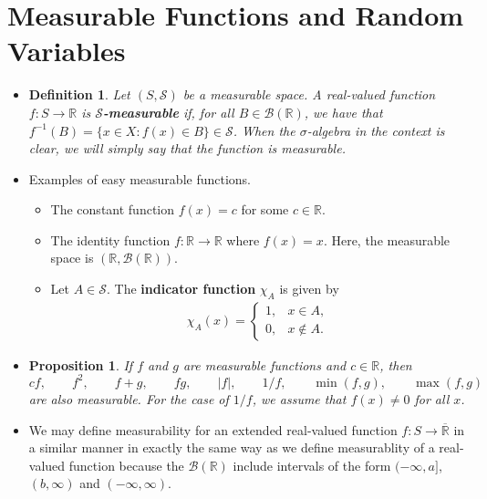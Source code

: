 \documentclass[10pt]{article}
\newtheorem{definition}[lemma]{Definition}
\newtheorem{proposition}[lemma]{Proposition}
\newcommand{\mcal}[1]{\mathcal{#1}}
\newcommand{\Real}{\mathbb{R}}
\begin{document}
\section{Measurable Functions and Random Variables}

\begin{itemize}
  \item \begin{definition}
    Let $(S, \mcal{S})$ be a measurable space. A real-valued function $f:S \rightarrow \Real$ is {\bf $\mcal{S}$-measurable} if, for all $B \in \mcal{B}(\Real)$, we have that $f^{-1}(B) = \{ x \in X : f(x) \in B \} \in \mcal{S}$. When the $\sigma$-algebra in the context is clear, we will simply say that the function is measurable.
  \end{definition}

  \item Examples of easy measurable functions.
  \begin{itemize}
    \item The constant function $f(x) = c$ for some $c \in \Real$.
    \item The identity function $f: \Real \rightarrow \Real$ where $f(x) = x$. Here, the measurable space is $(\Real, \mcal{B}(\Real))$.
    \item Let $A \in \mcal{S}$. The {\bf indicator function} $\chi_A$ is given by
    \begin{align*}
      \chi_A(x) = \begin{cases}
        1, & x \in A, \\
        0, & x \not\in A.
      \end{cases}
    \end{align*}    
  \end{itemize}

  \item \begin{proposition}
    If $f$ and $g$ are measurable functions and $c \in \Real$, then 
    $$ cf, \qquad f^2, \qquad f+g, \qquad fg, \qquad |f|, \qquad 1/f, \qquad \min(f,g), \qquad \max(f,g) $$
    are also measurable. For the case of $1/f$, we assume that $f(x) \neq 0$ for all $x$.
  \end{proposition}

  \item We may define measurability for an extended real-valued function $f: S \rightarrow \overline{\Real}$ in a similar manner in exactly the same way as we define measurablity of a real-valued function because the $\mcal{B}(\Real)$ include intervals of the form $(-\infty, a]$, $(b,\infty)$ and $(-\infty,\infty)$. 
  

\end{itemize}
\end{document}
